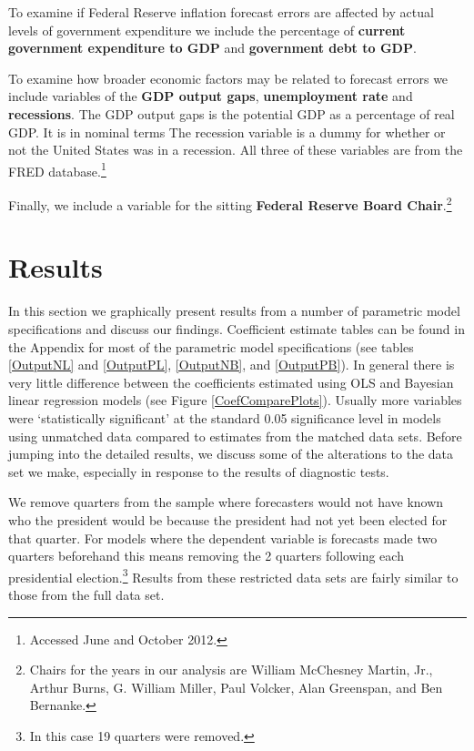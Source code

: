 \documentclass[a4paper]{article}\usepackage{graphicx, color}
\begin{document}
To examine if Federal Reserve inflation forecast errors are affected by actual levels of government expenditure we include the percentage of {\bf{current government expenditure to GDP}} and {\bf{government debt to GDP}}. 

To examine how broader economic factors may be related to forecast errors we include variables of the {\bf{GDP output gaps}}, {\bf{unemployment rate}} and {\bf{recessions}}. The GDP output gaps is the potential GDP as a percentage of real GDP. It is in nominal terms The recession variable is a dummy for whether or not the United States was in a recession. All three of these variables are from the FRED database.\footnote{Accessed June and October 2012.} 

Finally, we include a variable for the sitting {\bf{Federal Reserve Board Chair}}.\footnote{Chairs for the years in our analysis are William McChesney Martin, Jr., Arthur Burns, G. William Miller, Paul Volcker, Alan Greenspan, and Ben Bernanke.}

\section{Results}

In this section we graphically present results from a number of parametric model specifications and discuss our findings. Coefficient estimate tables can be found in the Appendix for most of the parametric model specifications (see tables \ref{OutputNL} and \ref{OutputPL}, \ref{OutputNB}, and \ref{OutputPB}). In general there is very little difference between the coefficients estimated using OLS and Bayesian linear regression models (see Figure \ref{CoefComparePlots}). Usually more variables were `statistically significant' at the standard 0.05 significance level in models using unmatched data compared to estimates from the matched data sets. Before jumping into the detailed results, we discuss some of the alterations to the data set we make, especially in response to the results of diagnostic tests. 

We remove quarters from the sample where forecasters would not have known who the president would be because the president had not yet been elected for that quarter. For models where the dependent variable is forecasts made two quarters beforehand this means removing the 2 quarters following each presidential election.\footnote{In this case 19 quarters were removed.} Results from these restricted data sets are fairly similar to those from the full data set.
\end{document}
